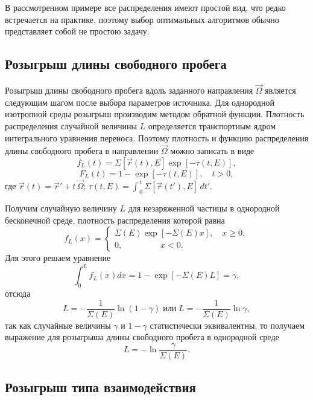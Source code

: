 \documentclass[
11pt,
master, %
subf, %
href, %
colorlinks=true, %
]{disser}
\begin{document}
В рассмотренном примере все распределения имеют простой вид, что редко встречается на практике, поэтому выбор оптимальных алгоритмов обычно представляет собой не простою задачу.

\subsection{Розыгрыш длины свободного пробега}

Розыгрыш длины свободного пробега вдоль заданного направления $\vec{\Omega }$ является следующим шагом после выбора параметров источника. Для однородной изотропной среды розыгрыш производим методом обратной функции. Плотность распределения случайной величины $L$ определяется транспортным ядром интегрального уравнения переноса. Поэтому плотность и функцию распределения  длины свободного пробега в направлении $\vec{\Omega }$ можно записать в виде
\[f_{L} (t)=\Sigma [\vec{r}(t),E]\exp [-\tau (t,E)],\]
\[F_{L} (t)=1-\exp [-\tau (t,E)],\quad t>0,\]
где $\vec{r}(t)=\vec{r}'+t\, \vec{\Omega }$; $\tau (t,E)=\int _{\, 0}^{\, t}\Sigma \left[\vec{r}(t'),E \right] \, dt'$.

Получим случайную величину $L$ для незаряженной частицы в однородной бесконечной среде, плотность распределения которой равна
\[f_{L} (x)=\left\{\begin{array}{l} {\Sigma (E)\exp [-\Sigma (E)x],\quad x\ge 0,} \\ {0,\quad \quad \quad \quad \, \, \, x<0.} \end{array}\right.\]
Для этого решаем уравнение
\[\int _{0}^{L}f_{L}  (x)dx=1-\exp [-\Sigma (E)L]=\gamma ,\]
отсюда
$$L=-\frac{1}{\Sigma (E)} \ln (1-\gamma )\;\text{или}\;L=-\frac{1}{\Sigma (E)} \ln \gamma,$$
так как случайные величины $\gamma $ и $1-\gamma $ статистически эквивалентны, то получаем выражение для розыгрыша длины свободного пробега в однородной среде
\[L=-\ln \frac{\gamma}{\Sigma (E)}.\]


\subsection{Розыгрыш типа взаимодействия}
\end{document}
